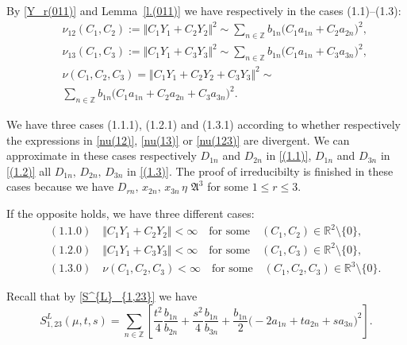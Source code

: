 \documentclass[preprint,12pt]{elsarticle}
\numberwithin{equation}{section}
\begin{document}
By \eqref{Y_r(011)} and Lemma~\ref{l.(011)} 
we have respectively in the cases (1.1)--(1.3):
%
\begin{eqnarray}
\label{nu(12)}
&& 
\nu_{12}( C_1, C_2):=\Vert C_1Y_1+C_2Y_2\Vert^2\sim \sum_{n\in \mathbb Z}b_{1n}\Big( C_1a_{1n}+C_2a_{2n}\Big)^2,\\
\label{nu(13)}
&& 
\nu_{13}( C_1, C_3):=\Vert C_1Y_1+C_3Y_3\Vert^2\sim \sum_{n\in \mathbb Z}b_{1n}\Big( C_1a_{1n}+C_3a_{3n}\Big)^2,\\
\nonumber
&& 
\nu( C_1, C_2, C_3)\!=\!\Vert C_1Y_1+\!C_2Y_2\!+\!C_3Y_3\Vert^2\!\sim\!\\
\label{nu(123)}
&&
\sum_{n\in \mathbb Z}b_{1n}\Big( C_1a_{1n}\!+\!C_2a_{2n}
\!+\!C_3a_{3n}\Big)^2.
\end{eqnarray}
%
\begin{rem}
\label{r.(011)-(1-3)(0-1)} 
We have three cases (1.1.1), (1.2.1) and (1.3.1) according to whether respectively the expressions in
\eqref{nu(12)}, \eqref{nu(13)} or \eqref{nu(123)} are 
divergent. We can approximate in these cases respectively   $D_{1n}$ and $ D_{2n}$ in \eqref{(1.1)},  $D_{1n}$ and $D_{3n}$ in \eqref{(1.2)} all $D_{1n},\,D_{2n},\,D_{3n}$ in \eqref{(1.3)}. The proof of irreducibilty is finished in these cases
because we have  $D_{rn},\, x_{2n},\,x_{3n}\,\eta\,\, {\mathfrak A}^3$ for some $1\leq r\leq 3$.


If the opposite holds, 
we have three different cases:
\begin{eqnarray*}
&&
(1.1.0)\quad\Vert C_1Y_1+C_2Y_2\Vert<\infty\quad  \text{for some}\quad
(C_1,C_2)\in {\mathbb R}^2\setminus\{0\},\\
&&
(1.2.0)\quad\Vert C_1Y_1+C_3Y_3\Vert<\infty\quad  \text{for some}\quad
(C_1,C_3)\in {\mathbb R}^2\setminus\{0\},\\
&&
(1.3.0)\quad\nu(C_1,C_2,C_3)<\infty
\quad \text{for some}\quad
(C_1,C_2,C_3)\in {\mathbb R}^3\setminus\{0\}.
\end{eqnarray*}
\end{rem}
%
Recall that by \eqref{S^{L}_{1,23}} we have
$$
S^{L}_{1,23}(\mu,t,s)=\sum_{n\in{\mathbb
Z}}\left[\frac{t^2}{4}\frac{b_{1n}}{b_{2n}}+\frac{s^2}{4}\frac{b_{1n}}{b_{3n}}+
\frac{b_{1n}}{2}\big(\!-\!2a_{1n}\!+\!ta_{2n}\!+\!sa_{3n}\big)^2\right].
$$
\end{document}
